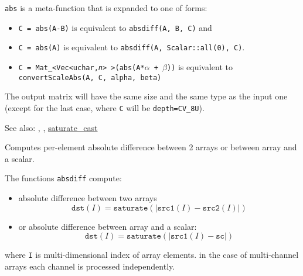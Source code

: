 \texttt{abs} is a meta-function that is expanded to one of  forms:

\begin{itemize}
    \item \texttt{C = abs(A-B)} is equivalent to \texttt{absdiff(A, B, C)} and
    \item \texttt{C = abs(A)} is equivalent to \texttt{absdiff(A, Scalar::all(0), C)}.
    \item \texttt{C = Mat\_<Vec<uchar,\emph{n}> >(abs(A*$\alpha$ + $\beta$))} is equivalent to \texttt{convertScaleAbs(A, C, alpha, beta)}
\end{itemize}

The output matrix will have the same size and the same type as the input one
(except for the last case, where \texttt{C} will be \texttt{depth=CV\_8U}).

See also: , , \hyperref[cppfunc.saturatecast]{saturate\_cast}

Computes per-element absolute difference between 2 arrays or between array and a scalar.


\begin{description}
\end{description}

The functions \texttt{absdiff} compute:
\begin{itemize}
    \item absolute difference between two arrays
    \[\texttt{dst}(I) = \texttt{saturate}(|\texttt{src1}(I) - \texttt{src2}(I)|)\]
    \item or absolute difference between array and a scalar:
    \[\texttt{dst}(I) = \texttt{saturate}(|\texttt{src1}(I) - \texttt{sc}|)\]
\end{itemize}
where \texttt{I} is multi-dimensional index of array elements.
in the case of multi-channel arrays each channel is processed independently.

